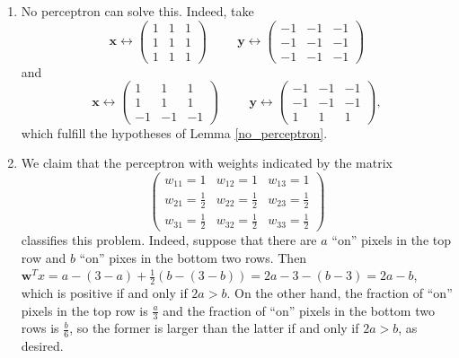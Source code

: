 \documentclass[12pt]{amsart}
\newcommand{\mbf}[1]{\mathbf{#1}}
\theoremstyle{remark}
\begin{document}
\begin{enumerate}
\item No perceptron can solve this. Indeed, take 
\[
\mbf{x} \leftrightarrow \begin{pmatrix} 1 & 1 & 1 \\ 1 & 1 & 1 \\ 1 & 1 & 1 \end{pmatrix} \hspace{1cm} \mbf{y} \leftrightarrow \begin{pmatrix} -1 & -1 & -1 \\ -1 & -1 & -1 \\ -1 & -1 & -1 \end{pmatrix} 
\]
 and  
\[
\mbf{x} \leftrightarrow \begin{pmatrix} 1 & 1 & 1 \\ 1 & 1 & 1 \\ -1 & -1 & -1 \end{pmatrix} \hspace{1cm} \mbf{y} \leftrightarrow \begin{pmatrix} -1 & -1 & -1 \\ -1 & -1 & -1 \\ 1 & 1 & 1 \end{pmatrix} ,
\]
which fulfill the hypotheses of Lemma \ref{no_perceptron}.

\item We claim that the perceptron with weights indicated by the matrix
\[
\begin{pmatrix} w_{11} = 1 & w_{12} = 1 & w_{13} = 1 \\ w_{21} = \frac{1}{2} & w_{22} = \frac{1}{2} &  w_{23} = \frac{1}{2}  \\ w_{31} = \frac{1}{2} & w_{32} = \frac{1}{2} & w_{33} = \frac{1}{2}  \end{pmatrix}
\]
classifies this problem. Indeed, suppose that there are $a$ ``on'' pixels in the top row and $b$ ``on'' pixes in the bottom two rows. Then $\mbf{w}^T  x = a - (3-a) + \frac{1}{2} (b - (3-b)) = 2a-3  - (b-3) = 2a - b$, which is positive if and only if $2a > b$. On the other hand, the fraction of ``on'' pixels in the top row is $\frac{a}{3}$ and the fraction of ``on'' pixels in the bottom two rows is $\frac{b}{6}$, so the former is larger than the latter if and only if $2a > b$, as desired. 


\end{enumerate}
\end{document}
